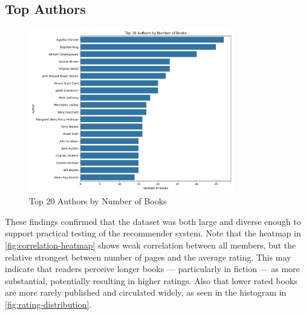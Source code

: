 \subsection{Top Authors}
\label{sec:top-authors}
\begin{figure}[H]
    \centering
    \includegraphics[width=0.8\textwidth]{figures/top_authors.png}
    \caption{Top 20 Authors by Number of Books}
    \label{fig:top-authors}
\end{figure}

These findings confirmed that the dataset was both large and diverse enough to support practical testing of the recommender system. 
Note that the heatmap in \autoref{fig:correlation-heatmap} shows weak correlation between all members, but the relative strongest between number of pages 
and the average rating. 
This may indicate that readers perceive longer books — particularly in fiction — as more substantial, potentially resulting in higher ratings.
Also that lower rated books are more rarely published and circulated widely, as seen in the histogram in \autoref{fig:rating-distribution}.